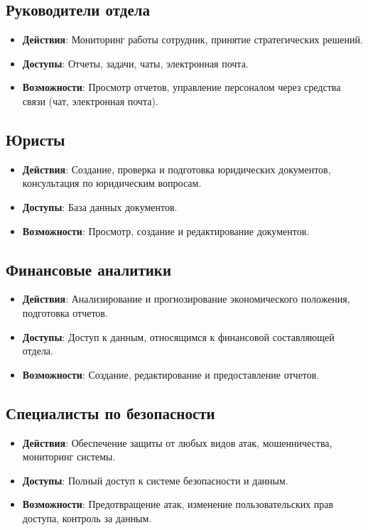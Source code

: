 \documentclass[20pt]{article}
\begin{document}
\subsection{Руководители отдела}
\begin{itemize}
    \item \textbf{Действия}: Мониторинг работы сотрудник, принятие стратегических решений.
    \item \textbf{Доступы}: Отчеты, задачи, чаты, электронная почта.
    \item \textbf{Возможности}: Просмотр отчетов, управление персоналом через средства связи (чат, электронная почта).
\end{itemize}

\subsection{Юристы}
\begin{itemize}
    \item \textbf{Действия}: Создание, проверка и подготовка юридических документов, консультация по юридическим вопросам.
    \item \textbf{Доступы}: База данных документов.
    \item \textbf{Возможности}: Просмотр, создание и редактирование документов.
\end{itemize}

\subsection{Финансовые аналитики}
\begin{itemize}
    \item \textbf{Действия}: Анализирование и прогнозирование экономического положения, подготовка отчетов.
    \item \textbf{Доступы}: Доступ к данным, относящимся к финансовой составляющей отдела.
    \item \textbf{Возможности}: Создание, редактирование и предоставление отчетов.
\end{itemize}

\subsection{Специалисты по безопасности}
\begin{itemize}
    \item \textbf{Действия}: Обеспечение защиты от любых видов атак, мошенничества, мониторинг системы.
    \item \textbf{Доступы}: Полный доступ к системе безопасности и данным.
    \item \textbf{Возможности}: Предотвращение атак, изменение пользовательских прав доступа, контроль за данным.
\end{itemize}
\end{document}
